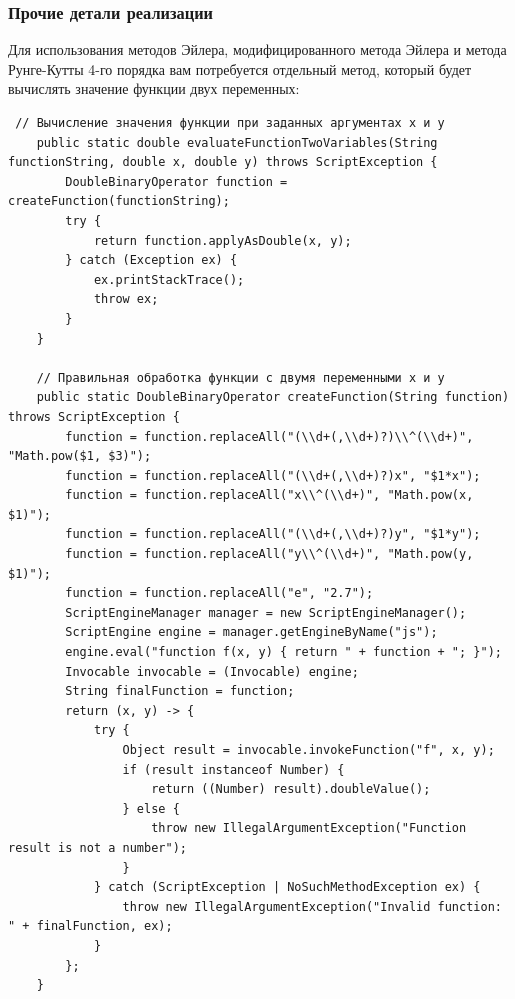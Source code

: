 \documentclass[12pt]{article}
\begin{document}
\subsubsection{Прочие детали реализации}

Для использования методов Эйлера, модифицированного метода Эйлера и метода Рунге-Кутты 4-го порядка вам потребуется отдельный метод, который будет вычислять значение функции двух переменных:

\begin{verbatim}
 // Вычисление значения функции при заданных аргументах x и y
    public static double evaluateFunctionTwoVariables(String functionString, double x, double y) throws ScriptException {
        DoubleBinaryOperator function = createFunction(functionString);
        try {
            return function.applyAsDouble(x, y);
        } catch (Exception ex) {
            ex.printStackTrace();
            throw ex;
        }
    }

    // Правильная обработка функции с двумя переменными x и y
    public static DoubleBinaryOperator createFunction(String function) throws ScriptException {
        function = function.replaceAll("(\\d+(,\\d+)?)\\^(\\d+)", "Math.pow($1, $3)");
        function = function.replaceAll("(\\d+(,\\d+)?)x", "$1*x");
        function = function.replaceAll("x\\^(\\d+)", "Math.pow(x, $1)");
        function = function.replaceAll("(\\d+(,\\d+)?)y", "$1*y");
        function = function.replaceAll("y\\^(\\d+)", "Math.pow(y, $1)");
        function = function.replaceAll("e", "2.7");
        ScriptEngineManager manager = new ScriptEngineManager();
        ScriptEngine engine = manager.getEngineByName("js");
        engine.eval("function f(x, y) { return " + function + "; }");
        Invocable invocable = (Invocable) engine;
        String finalFunction = function;
        return (x, y) -> {
            try {
                Object result = invocable.invokeFunction("f", x, y);
                if (result instanceof Number) {
                    return ((Number) result).doubleValue();
                } else {
                    throw new IllegalArgumentException("Function result is not a number");
                }
            } catch (ScriptException | NoSuchMethodException ex) {
                throw new IllegalArgumentException("Invalid function: " + finalFunction, ex);
            }
        };
    }\end{verbatim}
\end{document}
